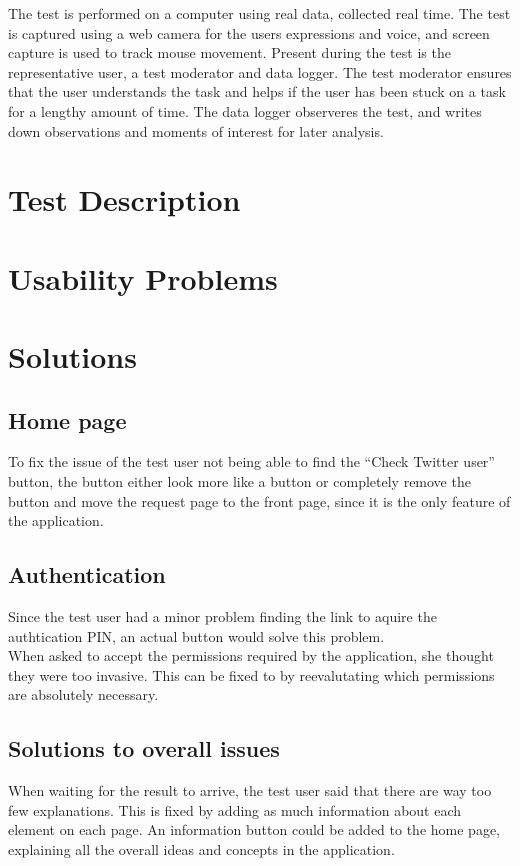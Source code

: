 The test is performed on a computer using real data, collected real time. The
test is captured using a web camera for the users expressions and voice, and
screen capture is used to track mouse movement. Present during the test is the
representative user, a test moderator and data logger. The test moderator
ensures that the user understands the task and helps if the user has been stuck
on a task for a lengthy amount of time. The data logger observeres the test,
and writes down observations and moments of interest for later analysis.

\section{Test Description}

\section{Usability Problems}

\section{Solutions}

\subsection{Home page}
To fix the issue of the test user not being able to find the ``Check Twitter
user'' button, the button either look more like a button or completely remove
the button and move the request page to the front page, since it is the only
feature of the application.

\subsection{Authentication}
Since the test user had a minor problem finding the link to aquire the
authtication PIN, an actual button would solve this problem.\\
When asked to accept the permissions required by the application, she thought
they were too invasive. This can be fixed to by reevalutating which permissions
are absolutely necessary.

\subsection{Solutions to overall issues}
When waiting for the result to arrive, the test user said that there are way too
few explanations. This is fixed by adding as much information about each element
on each page. An information button could be added to the home page, explaining
all the overall ideas and concepts in the application.

